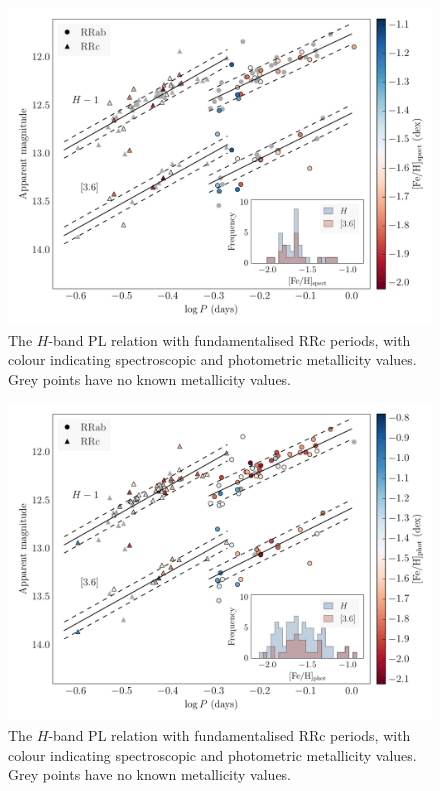 \documentclass[a4paper,fleqn,usenatbib]{mnras}
\begin{document}
\begin{figure}
\begin{center}
\includegraphics[width=160mm]{reworked_fitting_code/final_plots/spect_color_PL.pdf}
\caption{The $H$-band PL relation with fundamentalised RRc periods, with colour indicating spectroscopic \citep[top]{2006ApJ...640L..43S} and photometric \citep[bottom]{2000AJ....119.1824R} metallicity values. Grey points have no known metallicity values.}
\label{fig:hband}
\end{center}
\end{figure}

\begin{figure}
\begin{center}
\includegraphics[width=160mm]{reworked_fitting_code/final_plots/phot_color_PL.pdf}
\caption{The $H$-band PL relation with fundamentalised RRc periods, with colour indicating spectroscopic \citep[top]{2006ApJ...640L..43S} and photometric \citep[bottom]{2000AJ....119.1824R} metallicity values. Grey points have no known metallicity values.}
\label{fig:hband}
\end{center}
\end{figure}
\end{document}
